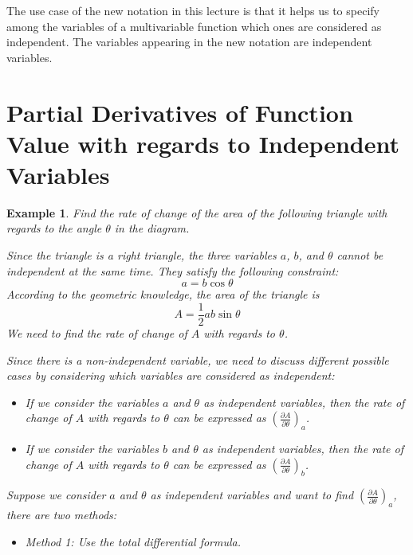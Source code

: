 \documentclass{article}
\newtheorem{example}{Example}
\begin{document}
The use case of the new notation in this lecture is that it helps us to specify 
among the variables of a multivariable function which ones are considered as 
independent. The variables appearing in the new notation are independent 
variables.

\section{Partial Derivatives of Function Value with regards to Independent Variables}

\begin{example}
  Find the rate of change of the area of the following triangle with regards to 
  the angle $\theta$ in the diagram.


  Since the triangle is a right triangle, the three variables $a$, $b$, and 
  $\theta$ cannot be independent at the same time. They satisfy the following 
  constraint:
  \[ a = b\cos\theta \]
  According to the geometric knowledge, the area of the triangle is
  \[ A = \frac{1}{2}ab\sin\theta \]
  We need to find the rate of change of $A$ with regards to $\theta$.

  Since there is a non-independent variable, we need to discuss different 
  possible cases by considering which variables are considered as independent:
  \begin{itemize}
    \item If we consider the variables $a$ and $\theta$ as independent 
      variables, then the rate of change of $A$ with regards to $\theta$ can be 
      expressed as $(\frac{\partial A}{\partial \theta})_a$.
    \item If we consider the variables $b$ and $\theta$ as independent
      variables, then the rate of change of $A$ with regards to $\theta$ can be 
      expressed as $(\frac{\partial A}{\partial \theta})_b$.
  \end{itemize}

  Suppose we consider $a$ and $\theta$ as independent variables and want to find 
  $(\frac{\partial A}{\partial \theta})_a$, there are two methods:
  \begin{itemize}
    \item Method 1: Use the total differential formula.


\end{itemize}
\end{example}
\end{document}

